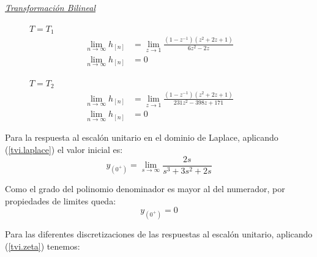 \documentclass[a4paper,12pt]{report}
\begin{document}
\begin{enumerate}[label=\alph*), left=0pt]
                {\centering\underline{\textit{Transformación Bilineal}}\par}
                \begin{figure}[h!]
                    \centering
                    \begin{minipage}{0.4\textwidth}
                        \centering
                        $T = T_1$
                        \begin{align*}
                            \lim_{n \to \infty} h_{[n]} &= \lim_{z \to 1}  \frac{\left(1 - z^{-1}\right) 
                                \left(z^2 + 2z + 1\right)}{6z^2 - 2z}\\
                            \lim_{n \to \infty} h_{[n]} &= 0
                        \end{align*}
                    \end{minipage}
                    \hspace{0.5cm}
                    \begin{minipage}{0.4\textwidth}
                        \centering
                        $T = T_2$
                        \begin{align*}
                            \lim_{n \to \infty} h_{[n]} &= \lim_{z \to 1} \frac{\left(1 - z^{-1}\right)
                                \left(z^2 + 2z + 1\right)}{231z^2 - 398z + 171}\\
                            \lim_{n \to \infty} h_{[n]} &= 0
                        \end{align*}
                    \end{minipage}
                \end{figure}

                Para la respuesta al escalón unitario en el dominio de Laplace, aplicando (\ref{tvi.laplace}) el valor inicial es:
                \begin{equation*}
                    y_{(0^+)} = \lim_{s \to \infty} \frac{2s}{s^3 + 3s^2 + 2s}
                \end{equation*}

                Como el grado del polinomio denominador es mayor al del numerador, por propiedades de limites queda:
                \begin{equation*}
                    y_{(0^+)} = 0
                \end{equation*}

                Para las diferentes discretizaciones de las respuestas al escalón unitario, aplicando (\ref{tvi.zeta}) tenemos:


\end{enumerate}
\end{document}
